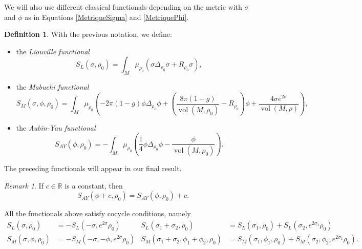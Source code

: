 \documentclass{article}
\theoremstyle{definition}
\newtheorem{Definition}[theorem]{Definition}
\theoremstyle{remark}
\newtheorem{Remark}[theorem]{Remark}
\DeclareMathOperator{\vol}{vol}
\begin{document}
We will also use different classical functionals depending on the metric with $\sigma$ and $\phi$ as in Equations \eqref{MetriqueSigma} and \eqref{MetriquePhi}. 
\begin{Definition}\label{DefLiouvMabAubYau}
    With the previous notation, we define: \begin{itemize}
        \item 
     the \emph{Liouville functional}  
    $$S_{L}(\sigma,\rho_{0})=\int_{M}\mu_{\rho_{0}}(\sigma\Delta_{\rho_{0}}\sigma+R_{\rho_{0}}\sigma),$$

     \item the \emph{Mabuchi functional}  
    $$S_{M}(\sigma,\phi,\rho_{0})=\int_{M}\mu_{\rho_{0}} \left(-2\pi(1-g)\phi\Delta_{\rho_{0}}\phi + \left( \frac{8\pi(1-g)}{\vol(M,\rho_{0})}-R_{\rho_{0}}\right)\phi+\frac{4\sigma e^{2\sigma}}{\vol(M,\rho)}\right),$$
    \item the \emph{Aubin-Yau functional}  
    $$S_{AY}(\phi,\rho_{0})=-\int_{M}\mu_{\rho_{0}}\left(\frac{1}{4}\phi \Delta_{\rho_{0}}\phi - \frac{\phi}{\vol(M,\rho_{0})}\right).$$
    \end{itemize}
\end{Definition}

The preceding functionals will appear in our final result.
\begin{Remark}
    If \( c \in \mathbb{R} \) is a constant, then  
    $$S_{AY}(\phi+c,\rho_{0})=S_{AY}(\phi,\rho_{0})+c.$$
\end{Remark}
All the functionals above satisfy cocycle conditions, namely 
\begin{align*} 
S_{L}(\sigma,\rho_{0})&=-S_{L}(-\sigma,e^{2\sigma}\rho_{0}) &  S_{L}(\sigma_{1}+\sigma_{2},\rho_{0})&=S_{L}(\sigma_{1},\rho_{0})+S_{L}(\sigma_{2},e^{2\sigma_{1}}\rho_{0})\\
    S_{M}(\sigma,\phi,\rho_{0})&=-S_{M}(-\sigma,-\phi,e^{2\sigma}\rho_{0}) & S_{M}(\sigma_{1}+\sigma_{2}, \phi_{1}+\phi_{2},\rho_{0})&=S_{M}(\sigma_{1},\phi_{1},\rho_{0})+S_{M}(\sigma_{2},\phi_{2},e^{2\sigma_{1}}\rho_{0}). 
\end{align*}
\end{document}
